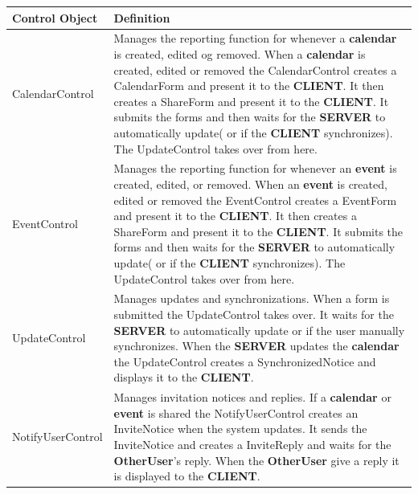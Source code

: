 \begin{tabular}{|l|p{10cm}|}
\hline
\textbf{Control Object} & \textbf{Definition} \\ \hline
CalendarControl & 
Manages the reporting function for whenever a \textbf{calendar} is created, edited og removed. 
When a \textbf{calendar} is created, edited or removed the CalendarControl creates a CalendarForm and present it to the \textbf{CLIENT}. It then creates a ShareForm and present it to the \textbf{CLIENT}. It submits the forms and then waits for the \textbf{SERVER} to automatically update( or if the \textbf{CLIENT} synchronizes). The UpdateControl takes over from here. \\ \hline
EventControl & 
Manages the reporting function for whenever an \textbf{event} is created, edited, or removed. 
When an \textbf{event} is created, edited or removed the EventControl creates a EventForm and present it to the \textbf{CLIENT}. It then creates a ShareForm and present it to the \textbf{CLIENT}. It submits the forms and then waits for the \textbf{SERVER} to automatically update( or if the \textbf{CLIENT} synchronizes). The UpdateControl takes over from here. \\ \hline
UpdateControl & 
Manages updates and synchronizations. When a form is submitted the UpdateControl takes over. It waits for the \textbf{SERVER} to automatically update or if the user manually synchronizes. 
When the \textbf{SERVER} updates the \textbf{calendar} the UpdateControl creates a SynchronizedNotice and displays it to the \textbf{CLIENT}. \\ \hline
NotifyUserControl & 
Manages invitation notices and replies. 
If a \textbf{calendar} or \textbf{event} is shared the NotifyUserControl creates an InviteNotice when the system updates. It sends the InviteNotice and creates a InviteReply and waits for the \textbf{OtherUser}’s reply. When the \textbf{OtherUser} give a reply it is displayed to the \textbf{CLIENT}. \\ \hline
\end{tabular}

\newpage
